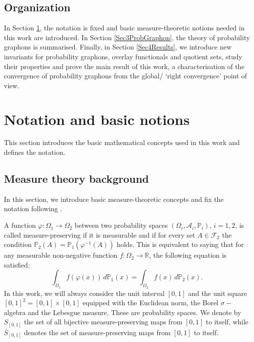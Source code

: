\documentclass[11pt]{article}
\def\P{\mathbb{P}}
\newcommand{\InvRelabel}{S_{[0,1]}}
\newcommand{\Relabel}{\bar{S}_{[0,1]}}
\renewcommand{\P}{\mathbb{P}}
\begin{document}
\subsection{Organization}
In Section \ref{Sec2Notat}, the notation is fixed and basic measure-theoretic notions needed in this work are introduced. In Section \ref{Sec3ProbGraphon}, the theory of probability graphons is summarised. Finally, in Section \ref{Sec4Results}, we introduce new invariants for probability graphons, overlay functionals and quotient sets, study their properties and prove the main result of this work, a characterisation of the convergence of probability graphons from the global/ `right convergence' point of view.  
\section{Notation and basic notions}\label{Sec2Notat}
This section introduces the basic mathematical concepts used in this work and defines the notation.
\subsection{Measure theory background}

In this section, we introduce basic measure-theoretic concepts and fix the notation following \cite{abraham2023probabilitygraphons}.

A function $\varphi : \Omega_1 \to \Omega_2$ between two probability spaces $(\Omega_i, \mathcal{A}_i, \P_i)$, $i = 1, 2$, is called measure-preserving if it is measurable and if for every set $A \in \mathcal{F}_2$ the condition $\P_2(A) = \P_1(\varphi^{-1}(A))$ holds. This is equivalent to saying that for any measurable non-negative function $f : \Omega_2 \to \mathbb{R}$, the following equation is satisfied:
\[
\int_{\Omega_1} f(\varphi(x))\, d\P_1(x) = \int_{\Omega_2} f(x)\, d\P_2(x).
\]
In this work, we will always consider the unit interval $[0,1]$ and the unit square $[0,1]^2=[0,1]\times [0,1]$ equipped with the Euclidean norm, the Borel $\sigma-$algebra and the Lebesgue measure. These are probability spaces.
We denote by $\InvRelabel$ the set of all bijective measure-preserving maps from $[0,1]$ to itself, while $\Relabel$ denotes the set of measure-preserving maps from $[0,1]$ to itself.
\medskip
\end{document}
